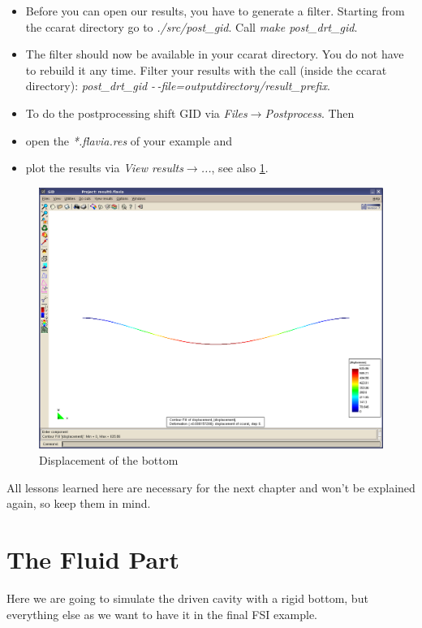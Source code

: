 \begin{itemize}
\item Before you can open our results, you have to generate a filter. Starting from the ccarat directory go to \emph{./src/post\_gid}. Call \emph{make post\_drt\_gid}.
\item The filter should now be available in your ccarat directory. You do not have to rebuild it any time. Filter your results with the call (inside the ccarat directory): \emph{post\_drt\_gid -\,-file=outputdirectory/result\_prefix}.
\item To do the postprocessing shift GID via \emph{Files$\to$Postprocess}.
Then 
\item open the \emph{{*}.flavia.res} of your example and 
\item plot the results via \emph{View results$\to$...}, see also \ref{tut_fsi:3.3}.
\end{itemize}
%
\begin{figure}[h]
\includegraphics[width=1\columnwidth]{Bilder/structure_03}


\caption{\label{tut_fsi:3.3} Displacement of the bottom}
\end{figure}


All lessons learned here are necessary for the next chapter and won't
be explained again, so keep them in mind.


\section{The Fluid Part}

Here we are going to simulate the driven cavity with a rigid bottom,
but everything else as we want to have it in the final FSI example.


